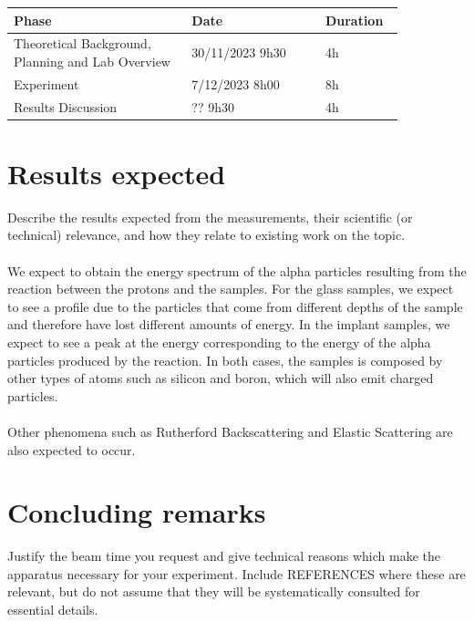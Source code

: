 \documentclass{article}
\begin{document}
\begin{multicols}{2}
\begin{table}[H]
\centering
\begin{tabular}{|w{0.4\linewidth}|w{0.3\linewidth}|w{0.15\linewidth}|}
\hline
Phase & Date & Duration \\ \hline
Theoretical Background, Planning and Lab Overview & 30/11/2023 9h30 & 4h \\ \hline
Experiment & 7/12/2023 8h00 & 8h \\ \hline
Results Discussion & ?? 9h30 & 4h \\ \hline
\end{tabular}
\end{table}

\section{Results expected}

Describe the results expected from the measurements, their scientific (or technical) relevance, and how they relate to existing work on the topic.

\paragraph{}

We expect to obtain the energy spectrum of the alpha particles resulting from the reaction between the protons and the samples. 
For the glass samples, we expect to see a profile due to the particles that come from different depths of the sample and therefore have lost different amounts of energy. In the implant samples, we expect to see a peak at the energy corresponding to the energy of the alpha particles produced by the reaction.
In both cases, the samples is composed by other types of atoms such as silicon and boron, which will also emit charged particles.

\paragraph{}

Other phenomena such as Rutherford Backscattering and Elastic Scattering are also expected to occur.

\section{Concluding remarks}

Justify the beam time you request and give technical reasons which make the apparatus necessary for your experiment. Include REFERENCES where these are relevant, but do not assume that they will be systematically consulted for essential details.

\printbibliography
\nocite{*}

\end{multicols}
\end{document}
